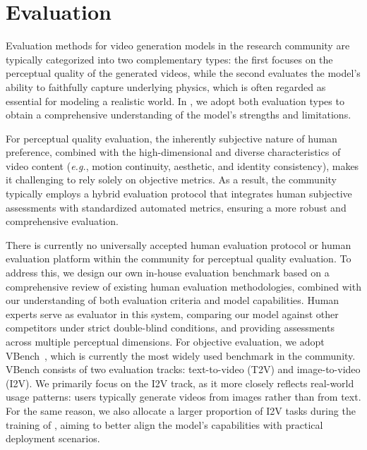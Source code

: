 \section{Evaluation}
\newcommand{\bbf}[1]{\textbf{ #1}}
\newcommand{\abf}[1]{#1}
\newcommand{\und}[1]{\underline{#1}}
\newcommand{\addword}[1]{\textcolor{blue}{#1}}
Evaluation methods for video generation models in the research community are typically categorized into two complementary types: the first focuses on the perceptual quality of the generated videos, while the second evaluates the model’s ability to faithfully capture underlying physics, which is often regarded as essential for modeling a realistic world. In \magi, we adopt both evaluation types to obtain a comprehensive understanding of the model’s strengths and limitations.

For perceptual quality evaluation, the inherently subjective nature of human preference, combined with the high-dimensional and diverse characteristics of video content (\emph{e.g.}, motion continuity, aesthetic, and identity consistency), makes it challenging to rely solely on objective metrics. As a result, the community typically employs a hybrid evaluation protocol that integrates human subjective assessments with standardized automated metrics, ensuring a more robust and comprehensive evaluation. 

There is currently no universally accepted human evaluation protocol or human evaluation platform within the community for perceptual quality evaluation. To address this, we design our own in-house evaluation benchmark based on a comprehensive review of existing human evaluation methodologies, combined with our understanding of both evaluation criteria and model capabilities. Human experts serve as evaluator in this system, comparing our model against other competitors under strict double-blind conditions, and providing assessments across multiple perceptual dimensions.
For objective evaluation, we adopt VBench~\citep{huang2024vbenchcomprehensiveversatilebenchmark}, which is currently the most widely used benchmark in the community. VBench consists of two evaluation tracks: text-to-video (T2V) and image-to-video (I2V). We primarily focus on the I2V track, as it more closely reflects real-world usage patterns: users typically generate videos from images rather than from text. For the same reason, we also allocate a larger proportion of I2V tasks during the training of \magi, aiming to better align the model's capabilities with practical deployment scenarios.

